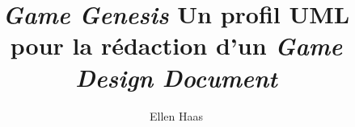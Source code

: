 \documentclass[12pt]{memoireuqam1.3}
\begin{document}
\title{\emph{Game Genesis} \hspace{20cm} Un profil UML pour la rédaction d'un \emph{Game Design Document}}
\author{Ellen Haas}
\uqammemoire %
{}
\thispagestyle{empty}        %
\maketitle



\renewcommand \bibname{BIBLIOGRAPHIE}
\renewcommand \listfigurename{LISTE DES FIGURES}
\renewcommand \appendixname{ANNEXE} %
\renewcommand \figurename{Figure}
\renewcommand \tablename{Tableau}

\addtocounter{page}{1} %

%
%

\tableofcontents %
\listoffigures %
\listoftables %





















\end{document}
